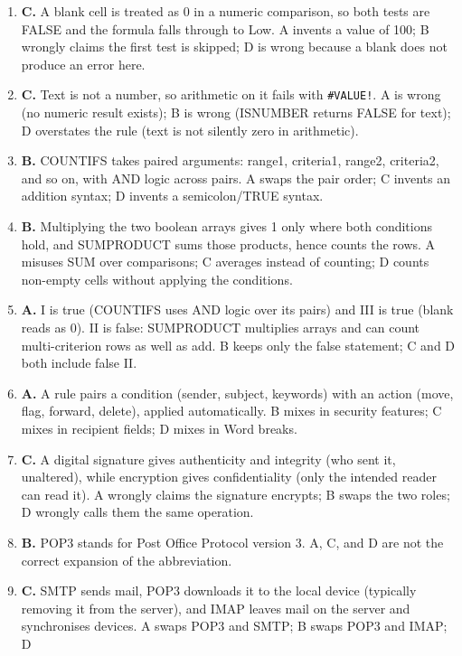\documentclass[11pt]{article}
\begin{document}
\begin{enumerate}[label=\textbf{Q\arabic*.}, leftmargin=*]
  A1 above 50; C needs both tests FALSE; D is not a value this formula
  produces.
\item \textbf{C.} A blank cell is treated as 0 in a numeric comparison, so
  both tests are FALSE and the formula falls through to Low. A invents a value
  of 100; B wrongly claims the first test is skipped; D is wrong because a
  blank does not produce an error here.
\item \textbf{C.} Text is not a number, so arithmetic on it fails with
  \texttt{\#VALUE!}. A is wrong (no numeric result exists); B is wrong
  (ISNUMBER returns FALSE for text); D overstates the rule (text is not
  silently zero in arithmetic).
\item \textbf{B.} COUNTIFS takes paired arguments: range1, criteria1, range2,
  criteria2, and so on, with AND logic across pairs. A swaps the pair order;
  C invents an addition syntax; D invents a semicolon/TRUE syntax.
\item \textbf{B.} Multiplying the two boolean arrays gives 1 only where both
  conditions hold, and SUMPRODUCT sums those products, hence counts the rows.
  A misuses SUM over comparisons; C averages instead of counting; D counts
  non-empty cells without applying the conditions.
\item \textbf{A.} I is true (COUNTIFS uses AND logic over its pairs) and III
  is true (blank reads as 0). II is false: SUMPRODUCT multiplies arrays and
  can count multi-criterion rows as well as add. B keeps only the false
  statement; C and D both include false II.
\item \textbf{A.} A rule pairs a condition (sender, subject, keywords) with an
  action (move, flag, forward, delete), applied automatically. B mixes in
  security features; C mixes in recipient fields; D mixes in Word breaks.
\item \textbf{C.} A digital signature gives authenticity and integrity (who
  sent it, unaltered), while encryption gives confidentiality (only the
  intended reader can read it). A wrongly claims the signature encrypts; B
  swaps the two roles; D wrongly calls them the same operation.
\item \textbf{B.} POP3 stands for Post Office Protocol version 3. A, C, and D
  are not the correct expansion of the abbreviation.
\item \textbf{C.} SMTP sends mail, POP3 downloads it to the local device
  (typically removing it from the server), and IMAP leaves mail on the server
  and synchronises devices. A swaps POP3 and SMTP; B swaps POP3 and IMAP; D

\end{enumerate}
\end{document}
